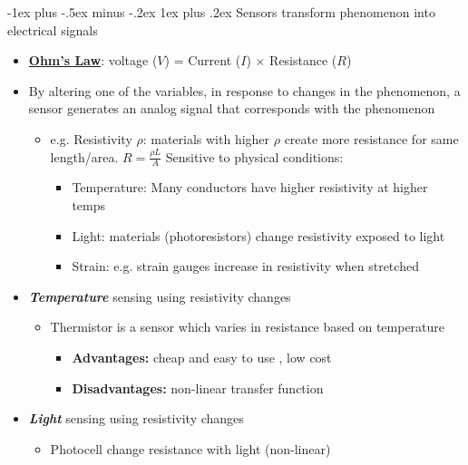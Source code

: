 \documentclass[10pt,landscape]{article}
\makeatletter
\newcommand{\subsubsubsection}{\@startsection{subsubsection}{3}{0mm}%
                                {-1ex plus -.5ex minus -.2ex}%
                                {1ex plus .2ex}%
                                {\normalfont\scriptsize\bfseries}}
\newcommand{\1}{\mathmybb{1}}
\makeatother
\begin{document}
\begin{multicols*}{3}
\subsubsubsection{Sensors transform phenomenon into electrical signals}
\begin{itemize}
  \item \textbf{\underline{Ohm's Law}}: voltage ($V$) = Current ($I$) $\times$ Resistance ($R$)
  \item By altering one of the variables, in response to changes in the phenomenon, a sensor generates an analog signal that corresponds with the phenomenon
  \begin{itemize}
    \item e.g. Resistivity $\rho$: materials with higher $\rho$ create more resistance for same length/area. $R = \frac{\rho L}{A}$ Sensitive to physical conditions:
    \begin{itemize}
      \item Temperature: Many conductors have higher resistivity at higher temps
      \item Light: materials (photoresistors) change resistivity exposed to light
      \item Strain: e.g. strain gauges increase in resistivity when stretched
    \end{itemize}
  \end{itemize}
  \item \textbf{\textit{Temperature}} sensing using resistivity changes
  \begin{itemize}
    \item Thermistor is a sensor which varies in resistance based on temperature
    \begin{itemize}
      \item \textbf{Advantages:} cheap and easy to use , low cost
      \item \textbf{Disadvantages:} non-linear transfer function
    \end{itemize}
  \end{itemize}
  \item \textbf{\textit{Light}} sensing using resistivity changes
  \begin{itemize}
    \item Photocell change resistance with light (non-linear)
  \end{itemize}
\end{itemize}


\end{multicols*}
\end{document}
